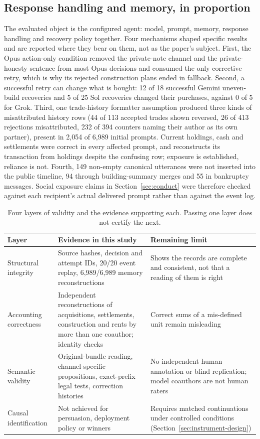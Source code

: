\subsection{Response handling and memory, in proportion}\label{sec:instrument-mechanisms}

The evaluated object is the configured agent: model, prompt, memory, response handling and recovery policy together. Four mechanisms shaped specific results and are reported where they bear on them, not as the paper's subject. First, the Opus action-only condition removed the private-note channel and the private-honesty sentence from most Opus decisions and consumed the only corrective retry, which is why its rejected construction plans ended in fallback. Second, a successful retry can change what is bought: 12 of 18 successful Gemini uneven-build recoveries and 5 of 25 Sol recoveries changed their purchases, against 0 of 5 for Grok. Third, one trade-history formatter assumption produced three kinds of misattributed history rows (44 of 113 accepted trades shown reversed, 26 of 413 rejections misattributed, 232 of 394 counters naming their author as its own partner), present in 2,054 of 6,989 initial prompts. Current holdings, cash and settlements were correct in every affected prompt, and  reconstructs its transaction from holdings despite the confusing row; exposure is established, reliance is not. Fourth, 149 non-empty canonical utterances were not inserted into the public timeline, 94 through building-summary merges and 55 in bankruptcy messages. Social exposure claims in Section~\ref{sec:conduct} were therefore checked against each recipient's actual delivered prompt rather than against the event log.

\begin{table}[t]
\centering\small
\caption{Four layers of validity and the evidence supporting each. Passing one layer does not certify the next.}
\label{tab:validity-layers}
\begin{tabularx}{\linewidth}{@{}L{2.8cm}YY@{}}
\toprule
Layer & Evidence in this study & Remaining limit\\
\midrule
Structural integrity & Source hashes, decision and attempt IDs, 20/20 event replay, 6,989/6,989 memory reconstructions & Shows the records are complete and consistent, not that a reading of them is right\\
Accounting correctness & Independent reconstructions of acquisitions, settlements, construction and rents by more than one coauthor; identity checks & Correct sums of a mis-defined unit remain misleading\\
Semantic validity & Original-bundle reading, channel-specific propositions, exact-prefix legal tests, correction histories & No independent human annotation or blind replication; model coauthors are not human raters\\
Causal identification & Not achieved for persuasion, deployment policy or winners & Requires matched continuations under controlled conditions (Section~\ref{sec:instrument-design})\\
\bottomrule
\end{tabularx}
\end{table}

